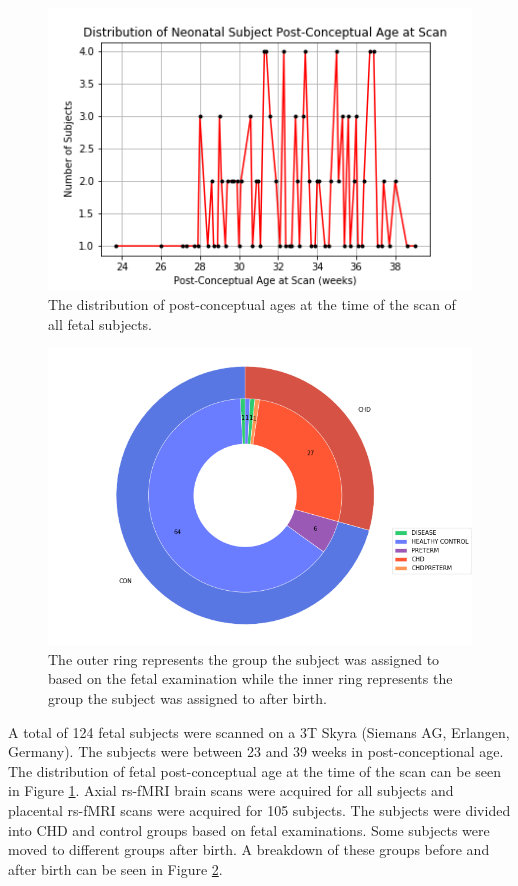 \begin{figure}
\centering
\includegraphics[width=.75\textwidth]{5/demo_fetal_scan_pca.png}
\caption{The distribution of post-conceptual ages at the time of the scan of all fetal subjects.}
\label{ch5:fetal:scanpca}
\end{figure}

\begin{figure}
\centering
\includegraphics[width=.9\textwidth]{5/demo_fetal_subj_cohort.png}
\caption{The outer ring represents the group the subject was assigned to based on the fetal examination while the inner ring represents the group the subject was assigned to after birth.}
\label{ch5:fetal:cohort}
\end{figure}

A total of 124 fetal subjects were scanned on a 3T Skyra (Siemans AG, Erlangen, Germany). The subjects were between 23 and 39 weeks in post-conceptional age. The distribution of fetal post-conceptual age at the time of the scan can be seen in Figure \ref{ch5:fetal:scanpca}. Axial rs-fMRI brain scans were acquired for all subjects and placental rs-fMRI scans were acquired for 105 subjects. The subjects were divided into CHD and control groups based on fetal examinations. Some subjects were moved to different groups after birth. A breakdown of these groups before and after birth can be seen in Figure \ref{ch5:fetal:cohort}.

